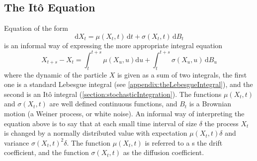 \documentclass[12pt]{book}
\begin{document}
\subsection{The It\^{o} Equation}\label{subsection:theItoEquation}
Equation of the form 
\begin{equation*}\label{eq:ItoEquation}
 \mathrm{d} X_t = \mu(X_t,t)\, \mathrm{d} t +  \sigma(X_t,t)\, \mathrm{d} B_t
\end{equation*}
is an informal way of expressing the more appropriate integral equation 
\begin{equation*}
X_{t+s} - X_{t} = \int_t^{t+s} \mu(X_u,u) \mathrm{d} u + \int_t^{t+s} \sigma(X_u,u)\, \mathrm{d} B_u
\end{equation*}
where the dynamic of the particle $X$ is given as a sum of two integrals, the first one is a standard Lebesgue integral (see \ref{appendix:theLebesgueIntegral}), and the second is an It\^{o} integral (\ref{section:stochasticIntegration}).  
The functions $\mu(X_t,t)$ and $\sigma(X_t,t)$ are well defined continuous functions, and $B_t$ is a Brownian motion (a Weiner process, or white noise). An informal way of interpreting the equation above is to say that at each small time interval of size $\delta$ the process $X_t$ is changed by a normally distributed value with expectation $\mu(X_t,t)\delta$ and variance $\sigma(X_t,t)^2\delta$. 
The function $\mu(X_t,t)$ is referred to a s the drift coefficient, and the function $\sigma(X_t,t)$ as the diffusion coefficient. 
\end{document}
